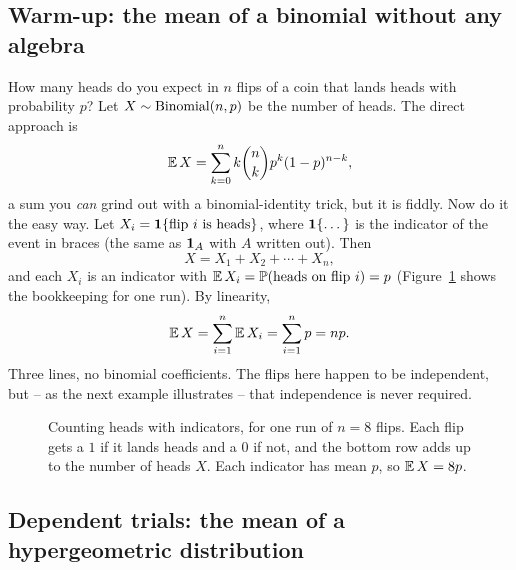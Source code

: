 \subsection{Warm-up: the mean of a binomial without any algebra}

How many heads do you expect in $n$ flips of a coin that lands heads with
probability $p$? Let $X \sim \operatorname{Binomial}(n,p)$ be the number of heads. The direct
approach is
\[
  \operatorname{\mathbb{E}} X = \sum_{k=0}^n k\binom{n}{k}p^k(1-p)^{n-k},
\]
a sum you \emph{can} grind out with a binomial-identity trick, but it is fiddly.
Now do it the easy way. Let $X_i = \mathbf{1}\{\text{flip } i \text{ is heads}\}$,
where $\mathbf{1}\{\dots\}$ is the indicator of the event in braces (the same as
$\mathbf{1}_A$ with $A$ written out). Then
\[
  X = X_1 + X_2 + \cdots + X_n,
\]
and each $X_i$ is an indicator with $\operatorname{\mathbb{E}} X_i = \operatorname{\mathbb{P}}(\text{heads on flip } i) = p$
(Figure~\ref{ch08:fig-indicator-flips} shows the bookkeeping for one run).
By linearity,
\[
  \operatorname{\mathbb{E}} X = \sum_{i=1}^n \operatorname{\mathbb{E}} X_i = \sum_{i=1}^n p = np.
\]
Three lines, no binomial coefficients. The flips here happen to be independent,
but -- as the next example illustrates -- that independence is never required.

\begin{figure}[H]
\centering
{}
\caption{Counting heads with indicators, for one run of $n=8$ flips. Each flip
gets a $1$ if it lands heads and a $0$ if not, and the bottom row adds up to the
number of heads $X$. Each indicator has mean $p$, so $\operatorname{\mathbb{E}} X = 8p$.}
\label{ch08:fig-indicator-flips}
\end{figure}

\subsection{Dependent trials: the mean of a hypergeometric distribution}
\label{ch08:hypergeometric-mean}

